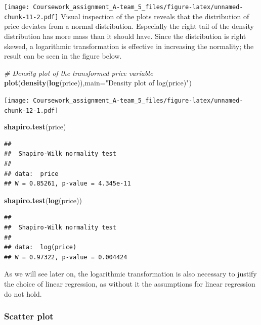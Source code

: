 \documentclass[]{article}
\newenvironment{Shaded}{\begin{snugshade}}{\end{snugshade}}
\newcommand{\KeywordTok}[1]{\textcolor[rgb]{0.13,0.29,0.53}{\textbf{#1}}}
\newcommand{\DataTypeTok}[1]{\textcolor[rgb]{0.13,0.29,0.53}{#1}}
\newcommand{\StringTok}[1]{\textcolor[rgb]{0.31,0.60,0.02}{#1}}
\newcommand{\CommentTok}[1]{\textcolor[rgb]{0.56,0.35,0.01}{\textit{#1}}}
\newcommand{\NormalTok}[1]{#1}
\begin{document}
\texttt{[image: Coursework\_assignment\_A-team\_5\_files/figure-latex/unnamed-chunk-11-2.pdf]}
Visual inspection of the plots reveals that the distribution of price
deviates from a normal distribution. Especially the right tail of the
density distribution has more mass than it should have. Since the
distribution is right skewed, a logarithmic transformation is effective
in increasing the normality; the result can be seen in the figure below.

\begin{Shaded}
\begin{Highlighting}[]
\CommentTok{# Density plot of the transformed price variable}
\KeywordTok{plot}\NormalTok{(}\KeywordTok{density}\NormalTok{(}\KeywordTok{log}\NormalTok{(price)),}\DataTypeTok{main=}\StringTok{"Density plot of log(price)"}\NormalTok{)}
\end{Highlighting}
\end{Shaded}

\texttt{[image: Coursework\_assignment\_A-team\_5\_files/figure-latex/unnamed-chunk-12-1.pdf]}

\begin{Shaded}
\begin{Highlighting}[]
\KeywordTok{shapiro.test}\NormalTok{(price)}
\end{Highlighting}
\end{Shaded}

\begin{verbatim}
## 
##  Shapiro-Wilk normality test
## 
## data:  price
## W = 0.85261, p-value = 4.345e-11
\end{verbatim}

\begin{Shaded}
\begin{Highlighting}[]
\KeywordTok{shapiro.test}\NormalTok{(}\KeywordTok{log}\NormalTok{(price))}
\end{Highlighting}
\end{Shaded}

\begin{verbatim}
## 
##  Shapiro-Wilk normality test
## 
## data:  log(price)
## W = 0.97322, p-value = 0.004424
\end{verbatim}

As we will see later on, the logarithmic transformation is also
necessary to justify the choice of linear regression, as without it the
assumptions for linear regression do not hold.

\subsubsection{Scatter plot}\label{scatter-plot}
\end{document}
